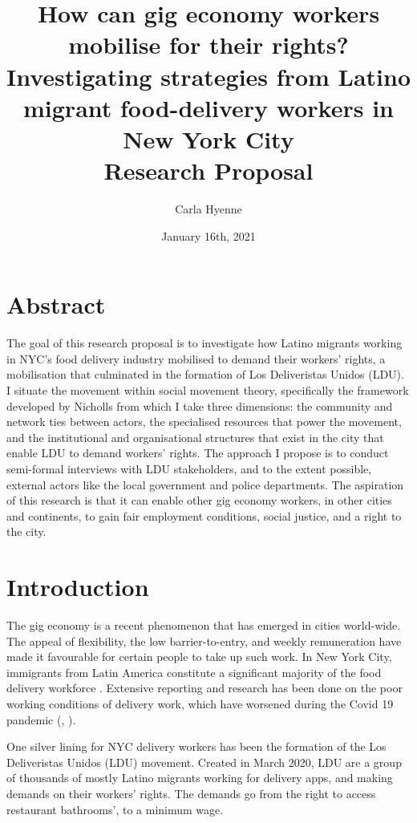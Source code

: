 \documentclass{article}
\title{How can gig economy workers mobilise for their rights? Investigating strategies from Latino migrant food-delivery workers in New York City \\[5ex]Research Proposal \\[3ex]}
\author{Carla Hyenne}
\date{January 16th, 2021}
\begin{document}
\maketitle

\section{Abstract}

The goal of this research proposal is to investigate how Latino migrants working in NYC’s food delivery industry mobilised to demand their workers’ rights, a mobilisation that culminated in the formation of Los Deliveristas Unidos (LDU).
I situate the movement within social movement theory, specifically the framework developed by Nicholls from which I take three dimensions: the community and network ties between actors, the specialised resources that power the movement, and the institutional and organisational structures that exist in the city that enable LDU to demand workers' rights.
The approach I propose is to conduct semi-formal interviews with LDU stakeholders, and to the extent possible, external actors like the local government and police departments.
The aspiration of this research is that it can enable other gig economy workers, in other cities and continents, to gain fair employment conditions, social justice, and a right to the city.

\pagebreak

\section{Introduction}

The gig economy is a recent phenomenon that has emerged in cities world-wide. The appeal of flexibility, the low barrier-to-entry, and weekly remuneration have made it favourable for certain people to take up such work. In New York City, immigrants from Latin America constitute a significant majority of the food delivery workforce \parencite{ldu_report2021}. Extensive reporting and research has been done on the poor working conditions of delivery work, which have worsened during the Covid 19 pandemic (\parencite{newyorker2020uncertain}, \parencite{nytimes2021risk}).

One silver lining for NYC delivery workers has been the formation of the Los Deliveristas Unidos (LDU) movement. Created in March 2020, LDU are a group of thousands of mostly Latino migrants working for delivery apps, and making demands on their workers’ rights. The demands go from the right to access restaurant bathrooms’, to a minimum wage. 
\end{document}
